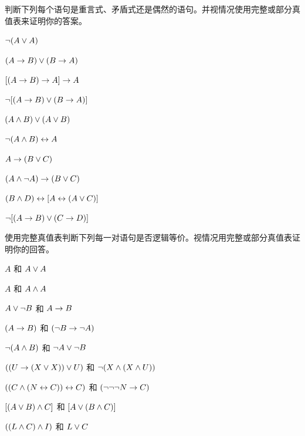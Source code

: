 \noindent\problempart
\label{pr.TT.TTorC4}
判断下列每个语句是重言式、矛盾式还是偶然的语句。并视情况使用完整或部分真值表来证明你的答案。

\begin{compactlist}
\item  $\neg (A \vee A)$\vspace{.5ex}							%
\item $(A \rightarrow B) \vee (B \rightarrow A)$\vspace{.5ex}					%
\item $[(A \rightarrow B) \rightarrow A] \rightarrow A$\vspace{.5ex}					%
\item $\neg[( A \rightarrow B) \vee (B \rightarrow A)]$\vspace{.5ex}			%
\item $(A \wedge B) \vee (A \vee B)$\vspace{.5ex} 				%
\item $\neg(A\wedge B) \leftrightarrow A$\vspace{.5ex} 					%
\item $A\rightarrow(B\vee C)$\vspace{.5ex} 							%
\item $(A \wedge\neg A) \rightarrow (B \vee C)$\vspace{.5ex} 			%
\item $(B\wedge D) \leftrightarrow [A \leftrightarrow(A \vee C)]$\vspace{.5ex}			%
\item $\neg[(A \rightarrow B) \vee (C \rightarrow D)]$\vspace{.5ex} 			%
\end{compactlist}

\noindent\problempart
使用完整真值表判断下列每一对语句是否逻辑等价。视情况用完整或部分真值表证明你的回答。

\begin{compactlist}
\item $A$ 和 $A \vee A$
\item $A$ 和 $A \wedge A$
\item $A \vee \neg B$ 和 $A\rightarrow B$
\item $(A \rightarrow B)$ 和 $(\neg B \rightarrow \neg A)$
\item $\neg(A \wedge B)$ 和 $\neg A \vee \neg B$
\item $ ((U \rightarrow (X \vee X)) \vee U)$ 和 $\neg (X \wedge (X \wedge U))$
\item $ ((C \wedge (N \leftrightarrow C)) \leftrightarrow C)$ 和 $(\neg \neg \neg N \rightarrow C)$
\item $[(A \vee B) \wedge C]$ 和 $[A \vee (B \wedge C)]$
\item $((L \wedge C) \wedge I)$ 和 $L \vee C$
\end{compactlist}

